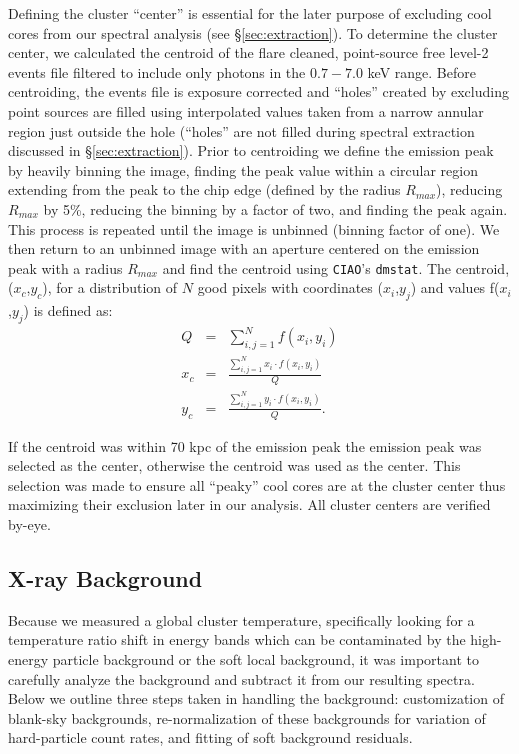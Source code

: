 \documentclass{emulateapj}
\begin{document}
Defining the cluster ``center'' is essential for the later purpose of
excluding cool cores from our spectral analysis (see
\S\ref{sec:extraction}). To determine the cluster center, we
calculated the centroid of the flare cleaned, point-source
free level-2 events file filtered to include only photons in the
$0.7-7.0$ keV range. Before centroiding, the events file is exposure
corrected and ``holes'' created by excluding point sources are filled
using interpolated values taken from a narrow annular region just
outside the hole (``holes'' are not filled during spectral extraction
discussed in \S\ref{sec:extraction}). Prior to centroiding we define
the emission peak by heavily binning the image, finding the peak value
within a circular region extending from the peak to the chip edge
(defined by the radius $R_{max}$), reducing $R_{max}$ by 5\%,
reducing the binning by a factor of two, and finding the peak
again. This process is repeated until the image is unbinned (binning
factor of one). We then return to an unbinned image with an aperture
centered on the emission peak with a radius $R_{max}$ and find the
centroid using {\tt CIAO}'s {\tt dmstat}. The centroid, ($x_c$,$y_c$),
for a distribution of $N$ good pixels with coordinates ($x_i$,$y_j$)
and values f($x_i$,$y_j$) is defined as:
\begin{eqnarray}
Q &=& \sum_{i,j=1}^N f(x_i,y_i) \\
x_c &=& \frac{\sum_{i,j=1}^N x_i \cdot f(x_i,y_i)}{Q} \nonumber \\
y_c &=& \frac{\sum_{i,j=1}^N y_i \cdot f(x_i,y_i)}{Q}. \nonumber
\end{eqnarray}

If the centroid was within 70 kpc of the emission peak the emission
peak was selected as the center, otherwise the centroid was used
as the center. This selection was made to ensure all ``peaky'' cool
cores are at the cluster center thus maximizing their exclusion later
in our analysis. All cluster centers are verified by-eye.

\subsection{X-ray Background} \label{sec:background}

Because we measured a global cluster temperature, specifically looking
for a temperature ratio shift in energy bands which can be
contaminated by the high-energy particle background or the soft local
background, it was important to carefully analyze the background and
subtract it from our resulting spectra. Below we outline three steps
taken in handling the background: customization of blank-sky backgrounds,
re-normalization of these backgrounds for variation of hard-particle
count rates, and fitting of soft background residuals.
\end{document}
